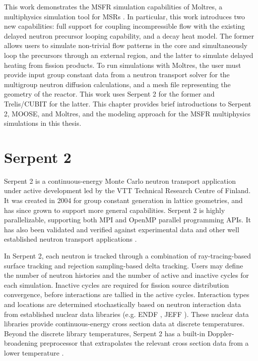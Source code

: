 This work demonstrates the \gls{MSFR} simulation capabilities of Moltres, a
multiphysics simulation tool for \glspl{MSR} \cite{lindsay_introduction_2018}.
In particular, this work introduces two new capabilities: full support
for coupling incompressible flow with the existing delayed neutron precursor
looping capability, and a decay heat model. The former allows users to
simulate non-trivial flow patterns in the core and simultaneously loop the
precursors through an external region, and the latter to simulate delayed
heating from fission products.
To run simulations with Moltres, the user must provide input
group constant data from a neutron transport solver for the
multigroup neutron diffusion calculations, and a mesh file representing the
geometry of the reactor. This work uses Serpent 2 \cite{leppanen_serpent_2014}
for the former and Trelis/CUBIT \cite{noauthor_trelis_2018} for the latter.
This chapter provides brief introductions to
Serpent 2, \gls{MOOSE}, and Moltres, and the modeling approach for the
\gls{MSFR} multiphysics simulations in this thesis.

\section{Serpent 2}

Serpent 2 \cite{leppanen_serpent_2014} is a continuous-energy Monte Carlo
neutron transport application under
active development led by the VTT Technical Research Centre of Finland. It was
created in 2004 for group constant generation in lattice geometries, and has
since grown to support more general capabilities. Serpent 2 is highly
parallelizable, supporting both MPI and OpenMP parallel programming APIs. It
has also been validated and verified against experimental data and other well
established neutron transport applications \cite{leppanen_calculation_2014}.

In Serpent 2, each neutron is tracked through a combination of
ray-tracing-based surface tracking and rejection sampling-based delta
tracking. Users may define the number of neutron histories and the number of
active and inactive cycles for each
simulation. Inactive cycles are required for fission source distribution
convergence, before interactions are tallied in the active cycles.
Interaction types and locations are
determined stochastically based on neutron interaction data from established
nuclear data libraries (e.g. ENDF \cite{chadwick_endf/b-vii.1_2011}, JEFF
\cite{oecd/nea_jeff-3.1.2_2014}). These nuclear data libraries provide
continuous-energy cross section data at discrete temperatures. Beyond the
discrete library temperatures, Serpent 2 has a built-in Doppler-broadening
preprocessor that extrapolates the relevant cross section data from a lower
temperature \cite{leppanen_serpent_2014}.

